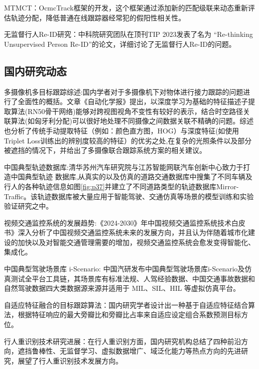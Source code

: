 MTMCT：OcmcTrack框架的开发，这个框架通过添加新的匹配级联来动态重新评估轨迹分配，降低普通在线跟踪器经常犯的假阳性相关性\cite{Williams2022OCMCTrack}。


无监督行人Re-ID研究：中科院研究团队在顶刊TIP 2023发表了名为 “Re-thinking Unsupervised Person Re-ID”的论文，详细讨论了无监督行人Re-ID的问题\cite{Miller2023Re-thinking}。



\subsection{国内研究动态}


多摄像机多目标跟踪综述:国内学者对于多摄像机下对物体进行接力跟踪的问题进行了全面性的概括。文章《自动化学报》提出\cite{wang2023research}，以深度学习为基础的特征描述子提取算法(RN50骨干网络)能够对跨视图视角不变性有较好的表示，结合时空路径关联算法(如匈牙利分配)可以很好地处理不同摄像之间数据关联不精确的问题。综述也分析了传统手动提取特征（例如：颜色直方图，HOG）与深度特征(如使用Triplet Loss训练出的辨别度较高的特征）的优劣之处,在复杂的光照条件以及部分被遮挡的情况下，并给出了多摄像联合跟踪系统方案的相关建议。


中国典型轨迹数据库:清华苏州汽车研究院与江苏智能网联汽车创新中心致力于打造中国典型轨迹 数据库,从真实的以及仿真的道路交通数据库中搜集了不同车辆及行人的各种轨迹信息如图\ref{fig:p37}并建立了不同道路类型的轨迹数据库Mirror-Traffic\cite{tsinghua2021mirrortraffic}。该轨迹数据库被大量应用于智能驾驶、交通仿真等场景的模型训练和实验验证研究之中。

视频交通监控系统的发展趋势:《2024-2030》年中国视频交通监控系统技术白皮书》\cite{cetc2024whitepaper}深入分析了中国视频交通监控系统未来的发展方向，并且认为伴随着城市化建设的加快以及对智能交通管理需要的增加，视频交通监控系统会愈发变得智能化、集成化。

中国典型驾驶场景库 i-Scenario: 中国汽研发布中国典型驾驶场景库i-Scenario及仿真测试全平台工具链，其场景库有标准法规、人驾经验数据、中国交通事故数据和自然驾驶数据四大类数据源来源并适用于 MIL、SIL、HIL 等虚拟仿真平台。

自适应特征融合的目标跟踪算法：国内研究学者设计出一种基于自适应特征结合算法，根据特征响应的最大旁瓣比和旁瓣比占率来自适应设定组合系数预测目标方位\cite{chen2023adaptive}。


行人重识别技术研究进展：在行人重识别方面，国内研究机构总结了四种前沿方向\cite{li2023progress}，遮挡鲁棒性、无监督学习、虚拟数据增广、域泛化能力等热点方向的先进研究，展望了行人重识别技术发展方向。






